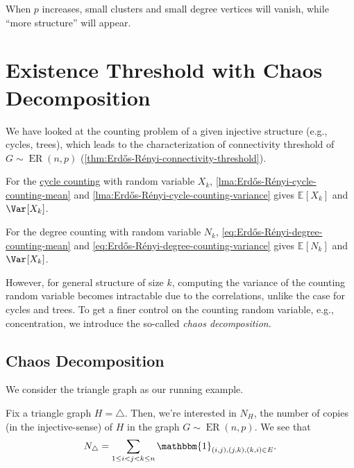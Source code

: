 \begin{note}
	When \(p\) increases, small clusters and small degree vertices will vanish, while ``more structure'' will appear.
\end{note}

\section{Existence Threshold with Chaos Decomposition}
We have looked at the counting problem of a given injective structure (e.g., cycles, trees), which leads to the characterization of connectivity threshold of \(G \sim \operatorname{ER}(n, p) \) (\autoref{thm:Erdős-Rényi-connectivity-threshold}).

\begin{prev}[Cycle]
	For the \hyperref[prb:cycle-counting]{cycle counting} with random variable \(X_k\), \autoref{lma:Erdős-Rényi-cycle-counting-mean} and \autoref{lma:Erdős-Rényi-cycle-counting-variance} gives \(\mathbb{E}_{}[X_k] \) and \(\Var_{}[X_k] \).
\end{prev}

\begin{prev}[Degree]
	For the degree counting with random variable \(N_k\), \autoref{eq:Erdős-Rényi-degree-counting-mean} and \autoref{eq:Erdős-Rényi-degree-counting-variance} gives \(\mathbb{E}_{}[N_k] \) and \(\Var_{}[X_k] \).
\end{prev}

However, for general structure of size \(k\), computing the variance of the counting random variable becomes intractable due to the correlations, unlike the case for cycles and trees. To get a finer control on the counting random variable, e.g., concentration, we introduce the so-called \emph{chaos decomposition}.

\subsection{Chaos Decomposition}
We consider the triangle graph as our running example.

\begin{eg}
	Fix a triangle graph \(H = \triangle\). Then, we're interested in \(N_H\), the number of copies (in the injective-sense) of \(H\) in the graph \(G \sim \operatorname{ER}(n, p) \). We see that
	\[
		N_{\triangle}
		= \sum_{1 \leq i < j < k \leq n} \mathbbm{1}_{(i, j), (j, k), (k, i) \in E}.
	\]
\end{eg}

